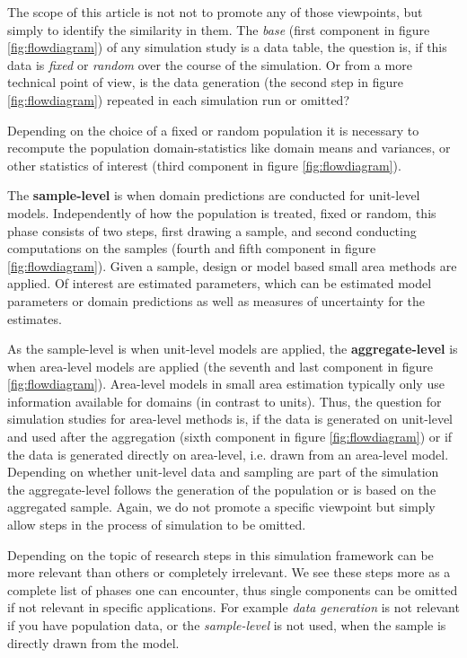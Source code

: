 \documentclass[article]{ajs}
\begin{document}
The scope of this article is not not to promote any of those viewpoints, but simply to identify the similarity in them. The \textit{base} (first component in figure \ref{fig:flowdiagram}) of any simulation study is a data table, the question is, if this data is \textit{fixed} or \textit{random} over the course of the simulation. Or from a more technical point of view, is the data generation (the second step in figure \ref{fig:flowdiagram}) repeated in each simulation run or omitted?

Depending on the choice of a fixed or random population it is necessary to recompute the population domain-statistics like domain means and variances, or other statistics of interest (third component in figure \ref{fig:flowdiagram}).

The \textbf{sample-level} is when domain predictions are conducted for unit-level models. Independently of how the population is treated, fixed or random, this phase consists of two steps, first drawing a sample, and second conducting computations on the samples (fourth and fifth component in figure \ref{fig:flowdiagram}). Given a sample, design or model based small area methods are applied. Of interest are estimated parameters, which can be estimated model parameters or domain predictions as well as measures of uncertainty for the estimates.

As the sample-level is when unit-level models are applied, the \textbf{aggregate-level} is when area-level models are applied (the seventh and last component in figure \ref{fig:flowdiagram}). Area-level models in small area estimation typically only use information available for domains (in contrast to units). Thus, the question for simulation studies for area-level methods is, if the data is generated on unit-level and used after the aggregation (sixth component in figure \ref{fig:flowdiagram}) or if the data is generated directly on area-level, i.e. drawn from an area-level model. Depending on whether unit-level data and sampling are part of the simulation the aggregate-level follows the generation of the population or is based on the aggregated sample. Again, we do not promote a specific viewpoint but simply allow steps in the process of simulation to be omitted.

Depending on the topic of research steps in this simulation framework can be more relevant than others or completely irrelevant. We see these steps more as a complete list of phases one can encounter, thus single components can be omitted if not relevant in specific applications. For example \textit{data generation} is not relevant if you have population data, or the \textit{sample-level} is not used, when the sample is directly drawn from the model.
\end{document}
